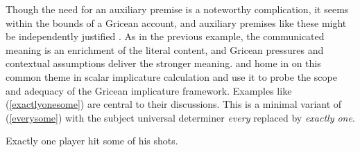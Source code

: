\documentclass[leqno,12pt]{article}
\newcommand{\eg}[1]{(\ref{#1})}
\newcommand{\word}[1]{\emph{#1}}
\begin{document}
{Though the need for an auxiliary premise is a noteworthy complication,
it seems within the bounds of a Gricean account, and auxiliary
premises like these might be independently justified
\citep{Russell06}. As in the previous example, the communicated
meaning is an enrichment of the literal content, and Gricean pressures
and contextual assumptions deliver the stronger
meaning. \citet{Geurts:Pouscoulous:2009} and
\citet{Chemla:Spector:2011} home in on this common theme in scalar
implicature calculation and use it to probe the scope and adequacy of
the Gricean implicature framework. Examples like \eg{exactlyonesome}
are central to their discussions.  This is a minimal variant of \eg{everysome}
with the subject universal determiner \word{every} replaced by
\word{exactly one}.
%
\begin{examples}
\item\label{exactlyonesome} Exactly one player hit some of his shots.
\end{examples}

}
\end{document}
